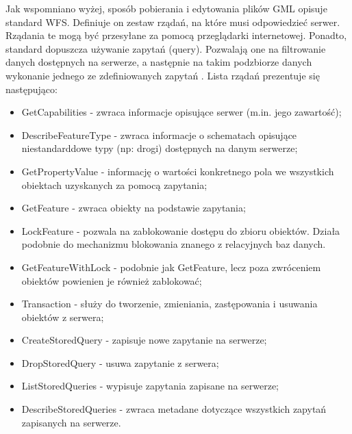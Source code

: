 Jak wspomniano wyżej, sposób pobierania i edytowania plików GML opisuje standard WFS. Definiuje on zestaw rządań, na które musi odpowiedzieć serwer.
Rządania te mogą być przesyłane za pomocą przeglądarki internetowej. Ponadto, standard dopuszcza używanie zapytań (query). Pozwalają one
na filtrowanie danych dostępnych na serwerze, a następnie na takim podzbiorze danych wykonanie jednego ze zdefiniowanych zapytań \cite{OpenGIS_WFS2010}.
Lista rządań prezentuje się następująco:
\begin{itemize}
    \item GetCapabilities - zwraca informacje opisujące serwer (m.in. jego zawartość);
    \item DescribeFeatureType - zwraca informacje o schematach opisujące niestandarddowe typy (np: drogi) dostępnych na danym serwerze;
    \item GetPropertyValue - informację o wartości konkretnego pola we wszystkich obiektach uzyskanych za pomocą zapytania;
    \item GetFeature - zwraca obiekty na podstawie zapytania;
    \item LockFeature - pozwala na zablokowanie dostępu do zbioru obiektów. Działa podobnie do mechanizmu blokowania znanego z relacyjnych
        baz danych.
    \item GetFeatureWithLock - podobnie jak GetFeature, lecz poza zwróceniem obiektów powienien je również zablokować;
    \item Transaction - służy do tworzenie, zmieniania, zastępowania i usuwania obiektów z serwera;
    \item CreateStoredQuery - zapisuje nowe zapytanie na serwerze;
    \item DropStoredQuery - usuwa zapytanie z serwera;
    \item ListStoredQueries - wypisuje zapytania zapisane na serwerze;
    \item DescribeStoredQueries - zwraca metadane dotyczące wszystkich zapytań zapisanych na serwerze.
\end{itemize}

